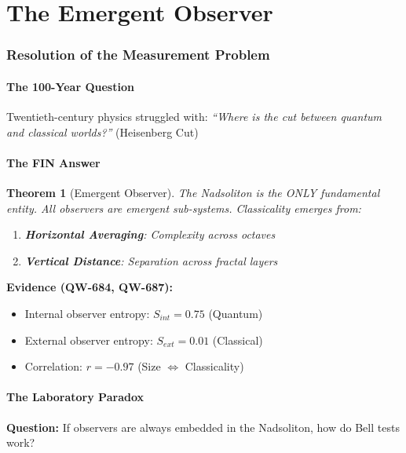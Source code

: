 \documentclass[11pt, a4paper]{article}
\newtheorem{theorem}{Theorem}[section]
\theoremstyle{remark}
\newcommand{\QW}[1]{\textbf{QW-#1}}
\begin{document}
\part{The Emergent Observer}

\section{Resolution of the Measurement Problem}

\subsection{The 100-Year Question}

Twentieth-century physics struggled with: \textit{``Where is the cut between quantum and classical worlds?''} (Heisenberg Cut)

\subsection{The FIN Answer}

\begin{theorem}[Emergent Observer]
The Nadsoliton is the ONLY fundamental entity. All observers are emergent sub-systems. Classicality emerges from:
\begin{enumerate}
    \item \textbf{Horizontal Averaging}: Complexity across octaves
    \item \textbf{Vertical Distance}: Separation across fractal layers
\end{enumerate}
\end{theorem}

\textbf{Evidence (\QW{684}, \QW{687}):}
\begin{itemize}
    \item Internal observer entropy: $S_{int} = 0.75$ (Quantum)
    \item External observer entropy: $S_{ext} = 0.01$ (Classical)
    \item Correlation: $r = -0.97$ (Size $\Leftrightarrow$ Classicality)
\end{itemize}

\subsection{The Laboratory Paradox}

\textbf{Question:} If observers are always embedded in the Nadsoliton, how do Bell tests work?
\end{document}

